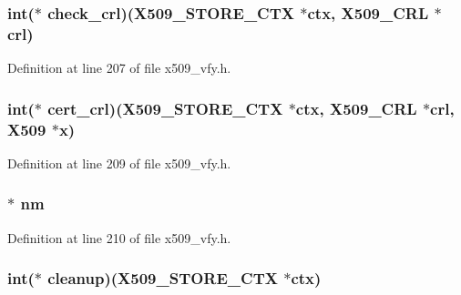\subsubsection[{\texorpdfstring{check\+\_\+crl}{check_crl}}]{\setlength{\rightskip}{0pt plus 5cm}int($\ast$ check\+\_\+crl)({\bf X509\+\_\+\+S\+T\+O\+R\+E\+\_\+\+C\+TX} $\ast$ctx, {\bf X509\+\_\+\+C\+RL} $\ast$crl)}\hypertarget{structx509__store__st_a8ff691bb54a96abfec0395cc3c18af64}{}\label{structx509__store__st_a8ff691bb54a96abfec0395cc3c18af64}


Definition at line 207 of file x509\+\_\+vfy.\+h.

\subsubsection[{\texorpdfstring{cert\+\_\+crl}{cert_crl}}]{\setlength{\rightskip}{0pt plus 5cm}int($\ast$ cert\+\_\+crl)({\bf X509\+\_\+\+S\+T\+O\+R\+E\+\_\+\+C\+TX} $\ast$ctx, {\bf X509\+\_\+\+C\+RL} $\ast$crl, {\bf X509} $\ast${\bf x})}\hypertarget{structx509__store__st_a14154457f88578e298eae33987207ff0}{}\label{structx509__store__st_a14154457f88578e298eae33987207ff0}


Definition at line 209 of file x509\+\_\+vfy.\+h.

\subsubsection[{\texorpdfstring{nm}{nm}}]{ $\ast$ nm}\hypertarget{structx509__store__st_a57a3541601842982e910946c748942ca}{}\label{structx509__store__st_a57a3541601842982e910946c748942ca}


Definition at line 210 of file x509\+\_\+vfy.\+h.

\subsubsection[{\texorpdfstring{cleanup}{cleanup}}]{\setlength{\rightskip}{0pt plus 5cm}int($\ast$ cleanup)({\bf X509\+\_\+\+S\+T\+O\+R\+E\+\_\+\+C\+TX} $\ast$ctx)}\hypertarget{structx509__store__st_a03a57d8a8f4971f2c51d152996d5a986}{}\label{structx509__store__st_a03a57d8a8f4971f2c51d152996d5a986}


